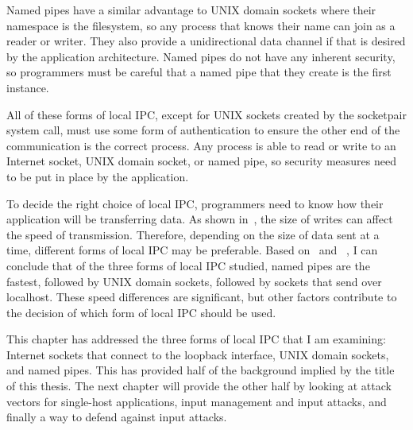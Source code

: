 Named pipes have a similar advantage to UNIX domain sockets where their namespace is the filesystem, so any process that knows their name can join as a reader or writer.  They also provide a unidirectional data channel if that is desired by the application architecture.  Named pipes do not have any inherent security, so programmers must be careful that a named pipe that they create is the first instance.

All of these forms of local IPC, except for UNIX sockets created by the socketpair system call, must use some form of authentication to ensure the other end of the communication is the correct process.  Any process is able to read or write to an Internet socket, UNIX domain socket, or named pipe, so security measures need to be put in place by the application.

To decide the right choice of local IPC, programmers need to know how their application will be transferring data.  As shown in~\cite{Xiurong2011TheAA}, the size of writes can affect the speed of transmission.  Therefore, depending on the size of data sent at a time, different forms of local IPC may be preferable.  Based on~\cite{immich2003performance} and ~\cite{Stevens:1997:UNP:522800}, I can conclude that of the three forms of local IPC studied, named pipes are the fastest, followed by UNIX domain sockets, followed by sockets that send over localhost.  These speed differences are significant, but other factors contribute to the decision of which form of local IPC should be used.

This chapter has addressed the three forms of local IPC that I am examining: Internet sockets that connect to the loopback interface, UNIX domain sockets, and named pipes.  This has provided half of the background implied by the title of this thesis.  The next chapter will provide the other half by looking at attack vectors for single-host applications, input management and input attacks, and finally a way to defend against input attacks.
